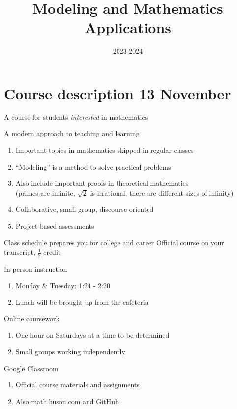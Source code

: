 \documentclass[onlytextwidth]{beamer}
\title{Modeling and Mathematics Applications}
\date{2023-2024}
\begin{document}
\frame{\titlepage}


\section{Course description \hfill 13 November}
\begin{frame}{A course for students \emph{interested} in mathematics}
  \begin{block}{A modern approach to teaching and learning}
  \begin{enumerate}
      \item Important topics in mathematics skipped in regular classes
      \item ``Modeling'' is a method to solve practical problems
      \item Also include important proofs in theoretical mathematics \\
      (primes are infinite, $\sqrt{2}$ is irrational, there are different sizes of infinity)
      \item Collaborative, small group, discourse oriented
      \item Project-based assessments
  \end{enumerate}
  \end{block}
  \end{frame}

\begin{frame}{Class schedule prepares you for college and career}
  {Official course on your transcript, $\frac{1}{2}$ credit}
  \begin{block}{In-person instruction}
    \begin{enumerate}
      \item Monday \& Tuesday: 1:24 - 2:20
      \item Lunch will be brought up from the cafeteria
    \end{enumerate}
    \end{block}
  \begin{block}{Online coursework}
    \begin{enumerate}
      \item One hour on Saturdays at a time to be determined
      \item Small groups working independently
    \end{enumerate}
    \end{block}
    \begin{block}{Google Classroom}
      \begin{enumerate}
        \item Official course materials and assignments
        \item Also \href{https://math.huson.com}{math.huson.com} and GitHub
      \end{enumerate}
      \end{block}
  \end{frame}
\end{document}

